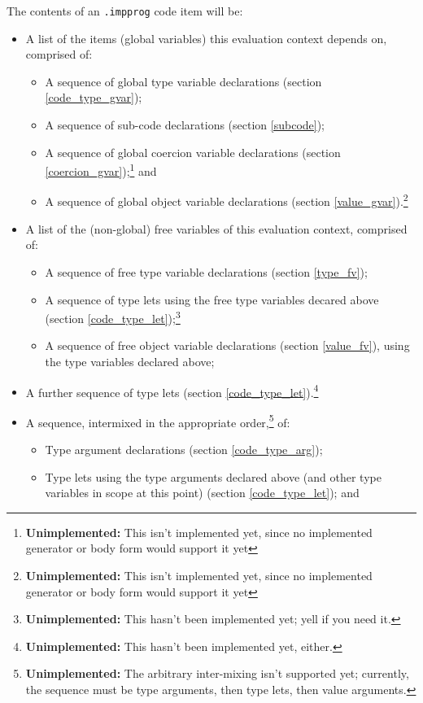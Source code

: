 \documentclass{report}
\newcommand\stringcode[1]{\texttt{#1}}
\newcommand\unimpl[1]{\footnote{\textbf{Unimplemented: }#1}}
\begin{document}
The contents of an \stringcode{.impprog} code item will be:
\begin{itemize}
    \item A list of the items (global variables) this evaluation context depends on, comprised of:
        \begin{itemize}
            \item A sequence of global type variable declarations (section \ref{code_type_gvar});
            \item A sequence of sub-code declarations (section \ref{subcode});
            \item A sequence of global coercion variable declarations (section \ref{coercion_gvar});\unimpl{This isn't implemented yet, since no implemented generator or body form would support it yet} and
            \item A sequence of global object variable declarations (section \ref{value_gvar}).\unimpl{This isn't implemented yet, since no implemented generator or body form would support it yet}
        \end{itemize}
    \item A list of the (non-global) free variables of this evaluation context, comprised of:
        \begin{itemize}
            \item A sequence of free type variable declarations (section \ref{type_fv});
            \item A sequence of type lets using the free type variables decared above (section \ref{code_type_let});\unimpl{This hasn't been implemented yet; yell if you need it.}
            \item A sequence of free object variable declarations (section \ref{value_fv}), using the type variables declared above;
        \end{itemize}
    \item A further sequence of type lets (section \ref{code_type_let}).\unimpl{This hasn't been implemented yet, either.}
    \item A sequence, intermixed in the appropriate order,\unimpl{The arbitrary inter-mixing isn't supported yet; currently, the sequence must be type arguments, then type lets, then value arguments.} of:
        \begin{itemize}
            \item Type argument declarations (section \ref{code_type_arg});
            \item Type lets using the type arguments declared above (and other type variables in scope at this point) (section \ref{code_type_let}); and

\end{itemize}
\end{itemize}
\end{document}
